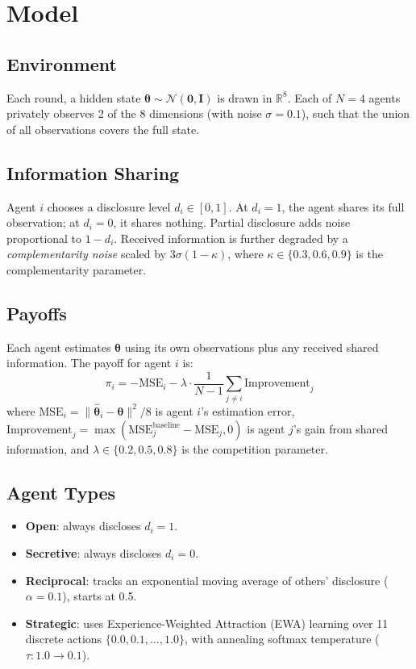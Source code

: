 \documentclass[11pt]{article}
\begin{document}
\section{Model}

\subsection{Environment}
Each round, a hidden state $\boldsymbol{\theta} \sim \mathcal{N}(\mathbf{0}, \mathbf{I})$ is drawn in $\mathbb{R}^8$.
Each of $N{=}4$ agents privately observes 2 of the 8 dimensions (with noise $\sigma{=}0.1$), such that the union of all observations covers the full state.

\subsection{Information Sharing}
Agent $i$ chooses a disclosure level $d_i \in [0,1]$.
At $d_i{=}1$, the agent shares its full observation; at $d_i{=}0$, it shares nothing.
Partial disclosure adds noise proportional to $1{-}d_i$.
Received information is further degraded by a \emph{complementarity noise} scaled by $3\sigma(1{-}\kappa)$, where $\kappa \in \{0.3, 0.6, 0.9\}$ is the complementarity parameter.

\subsection{Payoffs}
Each agent estimates $\boldsymbol{\theta}$ using its own observations plus any received shared information.
The payoff for agent $i$ is:
\[
  \pi_i = -\text{MSE}_i - \lambda \cdot \frac{1}{N{-}1}\sum_{j \neq i} \text{Improvement}_j
\]
where $\text{MSE}_i = \|\hat{\boldsymbol{\theta}}_i - \boldsymbol{\theta}\|^2 / 8$ is agent $i$'s estimation error, $\text{Improvement}_j = \max(\text{MSE}_j^{\text{baseline}} - \text{MSE}_j, 0)$ is agent $j$'s gain from shared information, and $\lambda \in \{0.2, 0.5, 0.8\}$ is the competition parameter.

\subsection{Agent Types}
\begin{itemize}
  \item \textbf{Open}: always discloses $d_i{=}1$.
  \item \textbf{Secretive}: always discloses $d_i{=}0$.
  \item \textbf{Reciprocal}: tracks an exponential moving average of others' disclosure ($\alpha{=}0.1$), starts at 0.5.
  \item \textbf{Strategic}: uses Experience-Weighted Attraction (EWA) learning over 11 discrete actions $\{0.0, 0.1, \ldots, 1.0\}$, with annealing softmax temperature ($\tau: 1.0 \to 0.1$).
\end{itemize}
\end{document}
